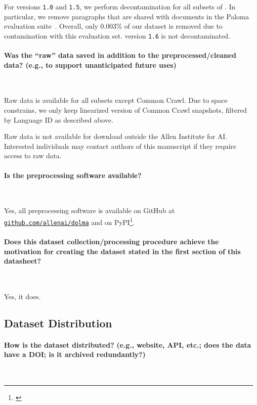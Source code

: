 For \dolma versions \texttt{1.0} and \texttt{1.5}, we perform decontamination for all subsets of \dolma. In particular, we remove paragraphs that are shared with documents in the Paloma evaluation suite~\citep{paloma}.
Overall, only 0.003\% of our dataset is removed due to contamination with this evaluation set. 
\dolma version \texttt{1.6} is not decontaminated.

\paragraph{Was the ``raw'' data saved in addition to the preprocessed/cleaned data? (e.g., to support unanticipated future uses)}~

Raw data is available for all subsets except Common Crawl. 
Due to space constrains, we only keep linearized version of Common Crawl snapshots, filtered by Language ID as described above. 

Raw data is not available for download outside the Allen Institute for AI. 
Interested individuals may contact authors of this manuscript if they require access to raw data.

\paragraph{Is the preprocessing software available?}~

Yes, all preprocessing software is available on GitHub at \href{https://github.com/allenai/dolma}{\texttt{github.com/allenai/dolma}} and on PyPI\footnote{\href{https://pypi.org/project/dolma/}{}}.

\paragraph{Does this dataset collection/processing procedure achieve the motivation for creating the dataset stated in the first section of this datasheet?}~

Yes, it does. 

\subsection{Dataset Distribution}

\paragraph{How is the dataset distributed? (e.g., website, API, etc.; does the data have a DOI; is it archived redundantly?)}~

